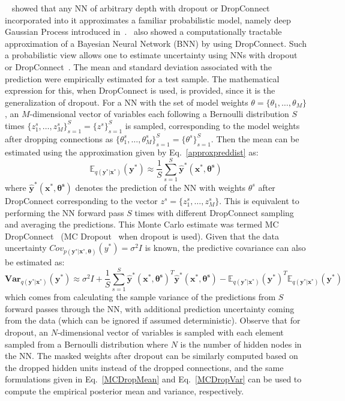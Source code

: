     ~\cite{DropoutUQ} showed that any NN of arbitrary depth with dropout or DropConnect incorporated into it approximates a familiar probabilistic model, namely deep Gaussian Process introduced in~\cite{DeepGP}.~\cite{DropConnectUQ} also showed a computationally tractable approximation of
    a Bayesian Neural Network (BNN) by using DropConnect. Such a probabilistic view allows one to estimate uncertainty using NNs with dropout or DropConnect~\cite{DropoutUQ, DropConnectUQ}. The mean and standard deviation associated with the prediction were empirically estimated for a test sample. The mathematical expression for this, when DropConnect is used, is provided, since it is the generalization of dropout. For a NN with the set of model weights $\theta = \{\theta_1, \ldots, \theta_M\}$, an $M$-dimensional vector of variables each following a Bernoulli distribution $S$ times $\{z^s_1, \ldots, z^s_M\}_{s=1}^S = \{z^s\}_{s=1}^S$ is sampled, corresponding to the model weights after dropping connections as $\{\theta^s_1, \ldots, \theta^s_M\}_{s=1}^S = \{\theta^s\}_{s=1}^S$. Then the mean can be estimated using the approximation given by Eq.~\ref{approxpreddist} as:
    \begin{equation}\label{MCDropMean}
        \mathbb{E}_{q(\mathbf{y^*|x^*})}(\mathbf{y^*}) \approx \frac{1}{S} \sum_{s=1}^S \mathbf{\hat{y}^*(x^*,\theta^s)}
    \end{equation}
    where $\mathbf{\hat{y}^*(x^*,\theta^s)}$ denotes the prediction of the NN with weights $\theta^s$ after DropConnect corresponding to the vector $z^s=\{z^s_1, \ldots, z^s_M\}$. This is equivalent to performing the NN forward pass $S$ times with different DropConnect sampling and averaging the predictions. This Monte Carlo estimate was termed MC DropConnect~\cite{DropConnectUQ} (MC Dropout~\cite{DropoutUQ} when dropout is used). Given that the data uncertainty $Cov_{p(\mathbf{y^*|x^*, \theta})}(y^*) = \sigma^2I$ is known, the predictive covariance can also be estimated as:
    \begin{equation}\label{MCDropVar}
        \mathbf{Var}_{q(\mathbf{y^*|x^*})}(\mathbf{y^*}) \approx \sigma^2I + \frac{1}{S} \sum_{s=1}^S \mathbf{\hat{y}^*(x^*,\theta^s)}^T \mathbf{\hat{y}^*(x^*,\theta^s)} - \mathbb{E}_{q(\mathbf{y^*|x^*})}(\mathbf{y^*})^T \mathbb{E}_{q(\mathbf{y^*|x^*})}(\mathbf{y^*})
    \end{equation}
    which comes from calculating the sample variance of the predictions from $S$ forward passes through the NN, with additional prediction uncertainty coming from the data (which can be ignored if assumed deterministic). Observe that for dropout, an $N$-dimensional vector of variables is sampled with each element sampled from a Bernoulli distribution where $N$ is the number of hidden nodes in the NN. The masked weights after dropout can be similarly computed based on the dropped hidden units instead of the dropped connections, and the same formulations given in Eq.~\ref{MCDropMean} and Eq.~\ref{MCDropVar} can be used to compute the empirical posterior mean and variance, respectively.
    \newline

